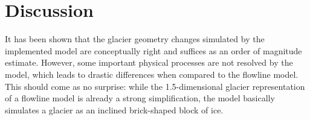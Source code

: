 \chapter{Discussion}\label{chap:discussion}
\thispagestyle{plain}






    It has been shown that the glacier geometry changes simulated by the implemented \vas{} model are conceptually right and suffices as an order of magnitude estimate. However, some important physical processes are not resolved by the \vas{} model, which leads to drastic differences when compared to the flowline model. This should come as no surprise: while the 1.5-dimensional glacier representation of a flowline model is already a strong simplification, the \vas{} model basically simulates a glacier as an inclined brick-shaped block of ice.

